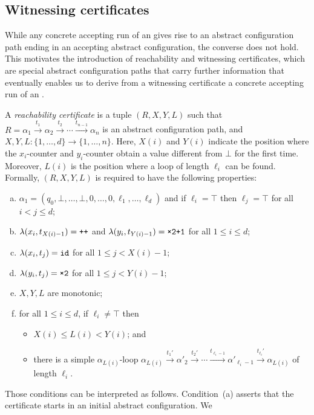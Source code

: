 \subsection{Witnessing certificates}

While any concrete accepting run of an \laVASS gives rise to an
abstract configuration path ending in an accepting abstract
configuration, the converse does not hold. This motivates the
introduction of reachability and witnessing certificates, which are
special abstract configuration paths that carry further information
that eventually enables us to derive from a witnessing certificate a
concrete accepting run of an \laVASS.

A \emph{reachability certificate} is a tuple $(R,X,Y,L)$ such that
$R=\alpha_1\xrightarrow{t_1} \alpha_2 \xrightarrow{t_2} \cdots
\xrightarrow{t_{n-1}} \alpha_n$ is an abstract configuration path, and
$X,Y,L\colon \{1,\ldots,d\} \to \{1,\ldots,n\}$. Here, $X(i)$ and
$Y(i)$ indicate the position where the $x_i$-counter and $y_i$-counter
obtain a value different from $\bot$ for the first time. Moreover,
$L(i)$ is the position where a loop of length $\ell_i$ can be found.
Formally, $(R,X,Y,L)$ is required to have the following properties:
%
\begin{enumerate}[(a)]
\item $\alpha_1 = (q_0,\bot, \ldots, \bot,0,\ldots,0,
  \ell_1,\ldots,\ell_d)$ and if $\ell_i=\top$ then $\ell_j=\top$ for
  all $i<j\le d$;
\item $\lambda(x_i,t_{X(i)-1})={\normalfont{\texttt{{++}}}}$ and $\lambda(y_i,t_{Y(i)-1})=\wTTPO$ for all $1\le i\le d$;
\item $\lambda(x_i,t_{j})={\normalfont{\texttt{{id}}}}$ for all $1\le j < X(i)-1$;
\item $\lambda(y_i,t_{j})=\wTT$ for all $1\le j < Y(i)-1$;
\item $X,Y,L$ are monotonic;
\item for all $1\le i\le d$, if $\ell_i\neq \top$ then
  \begin{itemize}
  \item $X(i)\le L(i)< Y(i)$; and
  \item there is a simple $\alpha_{L(i)}$-loop $\alpha_{L(i)}
    \xrightarrow{t_1'} \alpha'_2 \xrightarrow{t_2'} \cdots
    \xrightarrow{t_{\ell_i-1}} \alpha'_{\ell_i-1}
    \xrightarrow{t_{\ell_i}'} \alpha_{L(i)}$ of length $\ell_i$.
  \end{itemize}
\end{enumerate}
%
Those conditions can be interpreted as follows. Condition~(a) asserts
that the certificate starts in an initial abstract configuration. We
